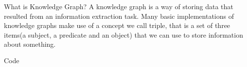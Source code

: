 \documentclass{beamer}
\begin{document}
	\begin{frame}[t]{What is Knowledge Graph?}
		\textcolor{OliveGreen}{A knowledge graph is a way of storing data that resulted from an information extraction task.} Many basic implementations of knowledge graphs make use of a concept we call triple, that is a set of three items(a subject, a predicate and an object) that we can use to store information about something.
	\end{frame}

	\begin{frame}[standout]
		Code
	\end{frame}
\end{document}
